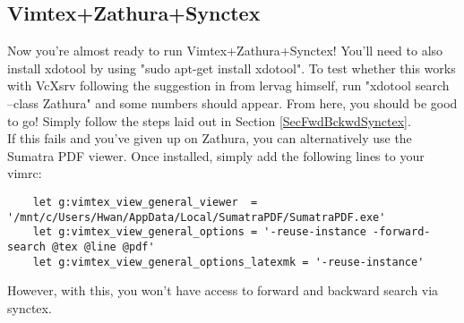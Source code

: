 \subsection{Vimtex+Zathura+Synctex}
Now you're almost ready to run Vimtex+Zathura+Synctex! You'll need to also
install xdotool by using "sudo apt-get install xdotool". To test whether this
works with VcXsrv following the suggestion in \cite{paulrougieux2020vimtex} from
lervag himself, run "xdotool search --class Zathura" and some numbers should
appear. From here, you should be good to go! Simply follow the steps laid out in
Section \ref{SecFwdBckwdSynctex}.\\

If this fails and you've given up on Zathura, you can alternatively use the
Sumatra PDF viewer. Once installed, simply add the following lines to your
vimrc:
\begin{lstlisting}
    let g:vimtex_view_general_viewer  = '/mnt/c/Users/Hwan/AppData/Local/SumatraPDF/SumatraPDF.exe'
    let g:vimtex_view_general_options = '-reuse-instance -forward-search @tex @line @pdf'
    let g:vimtex_view_general_options_latexmk = '-reuse-instance'
\end{lstlisting}
However, with this, you won't have access to forward and backward search via
synctex.
